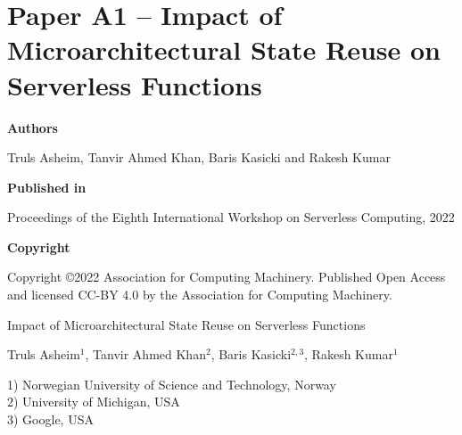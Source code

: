 \documentclass[../../../main.tex]{subfiles}
\begin{document}
{
\chapter[Paper A1 -- Impact of Microarchitectural State Reuse on Serverless Functions][Paper A1 -- Microarchitectural State Reuse in Serverless Functions]{Paper A1 -- Impact of Microarchitectural State Reuse on Serverless Functions}
\label{chap:wosc-paper}

\noindent \textbf{Authors}

\vspace*{0.3cm}

\noindent Truls Asheim, Tanvir Ahmed Khan, Baris Kasicki and Rakesh Kumar

\vspace*{0.7cm}

\noindent \textbf{Published in}

\vspace*{0.3cm}

\noindent Proceedings of the Eighth International Workshop on Serverless Computing, 2022

\vspace*{0.7cm}

\noindent \textbf{Copyright}

\vspace*{0.3cm}

\noindent Copyright ©2022 Association for Computing Machinery. Published Open Access and licensed CC-BY 4.0 by the Association for Computing Machinery.
}
\newpage


\vspace*{0.1cm}

\begin{center}

\Huge{Impact of Microarchitectural State Reuse on Serverless Functions}

\vspace{0.6cm}

\large{Truls Asheim$^{1}$, Tanvir Ahmed Khan$^{2}$, Baris Kasicki$^{2,3}$, Rakesh Kumar$^{1}$}

\vspace{0.1cm}

\small{1) Norwegian University of Science and Technology, Norway}\\
\small{2) University of Michigan, USA}\\
\small{3) Google, USA}\\


\end{center}
\end{document}

